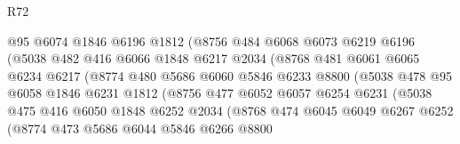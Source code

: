 \begin{lexlean}{R72}
\begin{coremodule}
                          @95
                          @6074
                          @1846
                          @6196
                          @1812
                          (@8756
                            @484
                            @6068
                            @6073
                            @6219
                            @6196
                            (@5038
                              @482
                              @416
                              @6066
                              @1848
                              @6217
                              @2034
                              (@8768
                                @481
                                @6061
                                @6065
                                @6234
                                @6217
                                (@8774
                                  @480
                                  @5686
                                  @6060
                                  @5846
                                  @6233
                                  @8800
                                  (@5038
                                    @478
                                    @95
                                    @6058
                                    @1846
                                    @6231
                                    @1812
                                    (@8756
                                      @477
                                      @6052
                                      @6057
                                      @6254
                                      @6231
                                      (@5038
                                        @475
                                        @416
                                        @6050
                                        @1848
                                        @6252
                                        @2034
                                        (@8768
                                          @474
                                          @6045
                                          @6049
                                          @6267
                                          @6252
                                          (@8774
                                            @473
                                            @5686
                                            @6044
                                            @5846
                                            @6266
                                            @8800

\end{coremodule}
\end{lexlean}
